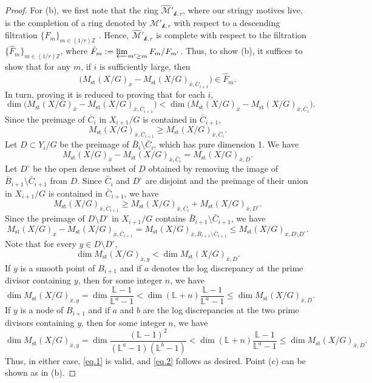 \documentclass[12pt]{amsart}
\theoremstyle{plain}   %
\theoremstyle{definition}    %
\theoremstyle{remark}    %
\numberwithin{equation}{theorem}
\DeclareMathOperator{\st}{\mathrm{st}}
\newcommand{\kay}{\mathcal{k}}
\newcommand{\sM}{\mathcal{M}}
\newcommand{\bL}{\mathbb{L}}
\newcommand{\bZ}{\mathbb{Z}}
\begin{document}
\begin{lemma}
\begin{proof}
For (b), we first note that the ring $\hat{\sM}'_{\kay,r}$, where our stringy motives live, is the completion of a ring denoted by $\sM'_{\kay,r}$ with respect to a descending filtration $\{F_m\}_{m\in (1/r)\bZ}$ \cite[p.~222]{YasudaMotivicIntegrationDeligneMumfordStack}. Hence, $\hat{\sM}'_{\kay,r}$ is complete with respect to the filtration $\{\hat F_m\}_{m\in (1/r)\bZ}$, where $\hat F_m := \varprojlim _{m'\ge m} F_m /F_{m'}$. Thus, to show (b), it suffices to show that for any $m$, if $i$ is sufficiently large, then 
\[
\big( M_{\st}(X/G)_{\bar{x}}-M_{\st}(X/G)_{\bar{x},\bar{C}_{i+1}} \big) \in \hat F_m. 
\]
In turn, proving it is reduced to proving that for each $i$, 
\begin{equation}\label{eq.2}
\dim \big( M_{\st}(X/G)_{\bar{x}}-M_{\st}(X/G)_{\bar{x},\bar{C}_{i+1}} \big) < 
\dim \big(M_{\st}(X/G)_{\bar{x}}-M_{\st}(X/G)_{\bar{x},\bar{C}_i}\big).
\end{equation}
Since the preimage of $\bar{C}_i$ in $X_{i+1}/G$ is contained in  $\bar{C}_{i+1}$,
\[
M_{\st}(X/G)_{\bar{x},\bar{C}_{i+1}}\ge M_{\st}(X/G)_{\bar{x},\bar{C}_i}.
\]
Let $D\subset Y_i/G$ be the preimage of $\bar{B}_i\setminus \bar{C}_i$, which has pure dimension 1. We have
\[
M_{\st}(X/G)_{\bar{x}}-M_{\st}(X/G)_{\bar{x},\bar{C}_i} = M_{\st}(X/G)_{\bar{x},D}.
\]
Let $D^\circ$ be the open dense subset of $D$ obtained by removing the image of 
$\bar{B}_{i+1}\setminus \bar{C}_{i+1}$ from $D$. Since $\bar{C}_i$ and $D^\circ$ are disjoint and the preimage of their union in $X_{i+1}/G$ is contained in $\bar{C}_{i+1}$, we have
\[
M_{\st}(X/G)_{\bar{x},\bar{C}_{i+1}} \ge M_{\st}(X/G)_{\bar{x},\bar{C}_{i}} + M_{\st}(X/G)_{\bar{x},D^\circ}.
\]
Since the preimage of $D\setminus D^\circ$ in $X_{i+1}/G$ contains $\bar{B}_{i+1}\setminus \bar{C}_{i+1}$, we have
\[
M_{\st}(X/G)_{\bar{x}}-M_{\st}(X/G)_{\bar{x},\bar{C}_{i+1}}
=M_{\st}(X/G)_{\bar{x},\bar{B}_{i+1}\setminus \bar{C}_{i+1}} 
\le  M_{\st}(X/G)_{\bar{x},D\setminus D^\circ}.
\]
Note that for every $y\in D \setminus D^\circ$, 
\begin{equation}\label{eq.1}
    \dim M_{\st}(X/G)_{\bar{x},y} < \dim M_{\st}(X/G)_{\bar{x},D}.
\end{equation}
If $y$ is a smooth point of $B_{i+1}$ and if $a$ denotes the log discrepancy at the prime divisor containing $y$, then for some integer $n$, we have
\[
\dim M_{\st}(X/G)_{\bar{x},y}= \dim \frac{\bL-1}{\bL^{a}-1} < \dim (\bL + n) \frac{\bL-1}{\bL^{a}-1} \le \dim M_{\st}(X/G)_{\bar{x},D}.
\]
If $y$ is a node of $B_{i+1}$ and if $a$ and $b$ are the log discrepancies at the two prime divisors containing $y$, then for some integer $n$, we have
\[
\dim M_{\st}(X/G)_{\bar{x},y}= \dim \frac{(\bL-1)^2}{(\bL^{a}-1)(\bL^{b}-1)} < \dim (\bL + n) \frac{\bL-1}{\bL^{a}-1} \le \dim M_{\st}(X/G)_{\bar{x},D}.
\]
Thus, in either case, \autoref{eq.1} is valid, and \autoref{eq.2} follows as desired.
Point (c) can be shown as in (b). 


\end{proof}
\end{lemma}
\end{document}
